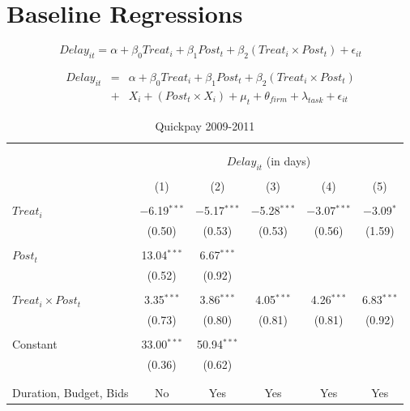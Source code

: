 \documentclass[
]{article}
\begin{document}
\hypertarget{baseline-regressions}{%
\section{Baseline Regressions}\label{baseline-regressions}}

\[ Delay_{it} = \alpha+\beta_0 Treat_i + \beta_1 Post_t + \beta_2 (Treat_i \times Post_t) + \epsilon_{it}\]

\[ \begin{aligned} Delay_{it} &=& \alpha+\beta_0 Treat_i + \beta_1 Post_t + \beta_2 (Treat_i \times Post_t)\\
&+&  X_i + (Post_t \times X_i) + \mu_t + \theta_{firm} + \lambda_{task}+ \epsilon_{it}
\end{aligned}\]

\begin{table}[H] \centering 
  \caption{Quickpay 2009-2011} 
  \label{} 
\small 
\begin{tabular}{@{\extracolsep{-2pt}}lccccc} 
\\[-1.8ex]\hline 
\hline \\[-1.8ex] 
\\[-1.8ex] & \multicolumn{5}{c}{$Delay_{it}$ (in days)} \\ 
\\[-1.8ex] & (1) & (2) & (3) & (4) & (5)\\ 
\hline \\[-1.8ex] 
 $Treat_i$ & $-$6.19$^{***}$ & $-$5.17$^{***}$ & $-$5.28$^{***}$ & $-$3.07$^{***}$ & $-$3.09$^{*}$ \\ 
  & (0.50) & (0.53) & (0.53) & (0.56) & (1.59) \\ 
  & & & & & \\ 
 $Post_t$ & 13.04$^{***}$ & 6.67$^{***}$ &  &  &  \\ 
  & (0.52) & (0.92) &  &  &  \\ 
  & & & & & \\ 
 $Treat_i \times Post_t$ & 3.35$^{***}$ & 3.86$^{***}$ & 4.05$^{***}$ & 4.26$^{***}$ & 6.83$^{***}$ \\ 
  & (0.73) & (0.80) & (0.81) & (0.81) & (0.92) \\ 
  & & & & & \\ 
 Constant & 33.00$^{***}$ & 50.94$^{***}$ &  &  &  \\ 
  & (0.36) & (0.62) &  &  &  \\ 
  & & & & & \\ 
\hline \\[-1.8ex] 
Duration, Budget, Bids & No & Yes & Yes & Yes & Yes \\ 

\end{tabular}
\end{table}
\end{document}
